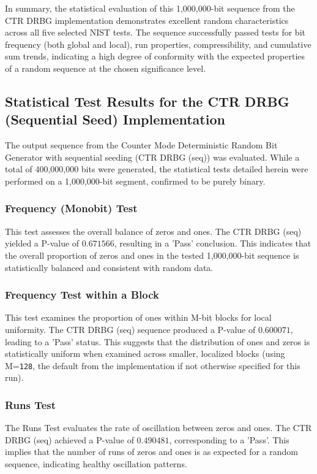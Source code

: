 \noindent 

In summary, the statistical evaluation of this 1,000,000-bit sequence from the CTR DRBG implementation demonstrates excellent random characteristics across all five selected NIST tests. The sequence successfully passed tests for bit frequency (both global and local), run properties, compressibility, and cumulative sum trends, indicating a high degree of conformity with the expected properties of a random sequence at the chosen significance level.

\subsection{Statistical Test Results for the CTR DRBG (Sequential Seed) Implementation} 

The output sequence from the Counter Mode Deterministic Random Bit Generator with sequential seeding (CTR DRBG (seq)) was evaluated. While a total of 400,000,000 bits were generated, the statistical tests detailed herein were performed on a 1,000,000-bit segment, confirmed to be purely binary. 

\subsubsection{\textbf{Frequency (Monobit) Test}}
This test assesses the overall balance of zeros and ones. The CTR DRBG (seq) yielded a P-value of $0.671566$, resulting in a 'Pass' conclusion. This indicates that the overall proportion of zeros and ones in the tested 1,000,000-bit sequence is statistically balanced and consistent with random data.

\subsubsection{\textbf{Frequency Test within a Block}}
This test examines the proportion of ones within M-bit blocks for local uniformity. The CTR DRBG (seq) sequence produced a P-value of $0.600071$, leading to a 'Pass' status. This suggests that the distribution of ones and zeros is statistically uniform when examined across smaller, localized blocks (using M=\texttt{128}, the default from the implementation if not otherwise specified for this run).

\subsubsection{\textbf{Runs Test}}
The Runs Test evaluates the rate of oscillation between zeros and ones. The CTR DRBG (seq) achieved a P-value of $0.490481$, corresponding to a 'Pass'. This implies that the number of runs of zeros and ones is as expected for a random sequence, indicating healthy oscillation patterns.

